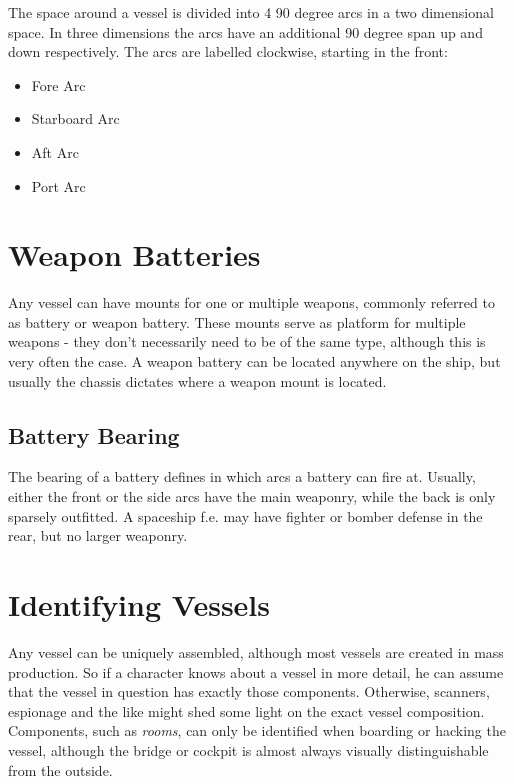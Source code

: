 The space around a vessel is divided into 4 90 degree arcs in a two dimensional space. In three dimensions the arcs have an additional 90 degree span up and down respectively. The arcs are labelled clockwise, starting in the front:

\begin{itemize}
  \item Fore Arc
  \item Starboard Arc
  \item Aft Arc
  \item Port Arc
\end{itemize}

\section{Weapon Batteries}
\label{sec:Vessels-Weapon-Batteries}

Any vessel can have mounts for one or multiple weapons, commonly referred to as battery or weapon battery. These mounts serve as platform for multiple weapons - they don't necessarily need to be of the same type, although this is very often the case. A weapon battery can be located anywhere on the ship, but usually the chassis dictates where a weapon mount is located.

\subsection{Battery Bearing}
\label{sub:Vessels-Battery-Bearing}

The bearing of a battery defines in which arcs a battery can fire at. Usually, either the front or the side arcs have the main weaponry, while the back is only sparsely outfitted. A spaceship f.e. may have fighter or bomber defense in the rear, but no larger weaponry.

\section{Identifying Vessels}
\label{sec:Vessels-Identifying Vessels}

Any vessel can be uniquely assembled, although most vessels are created in mass production. So if a character knows about a vessel in more detail, he can assume that the vessel in question has exactly those components. Otherwise, scanners, espionage and the like might shed some light on the exact vessel composition. Components, such as \emph{rooms}, can only be identified when boarding or hacking the vessel, although the bridge or cockpit is almost always visually distinguishable from the outside.

